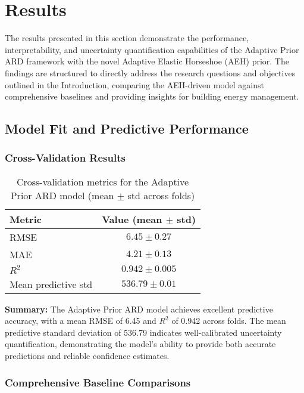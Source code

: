 \section{Results}

The results presented in this section demonstrate the performance, interpretability, and uncertainty quantification capabilities of the Adaptive Prior ARD framework with the novel Adaptive Elastic Horseshoe (AEH) prior. The findings are structured to directly address the research questions and objectives outlined in the Introduction, comparing the AEH-driven model against comprehensive baselines and providing insights for building energy management.

\subsection{Model Fit and Predictive Performance}

\subsubsection{Cross-Validation Results}

\begin{table}[ht]
\centering
\caption{Cross-validation metrics for the Adaptive Prior ARD model (mean $\pm$ std across folds)}
\label{tab:cv_metrics}
\begin{tabular}{|l|c|}
\hline
\textbf{Metric} & \textbf{Value (mean $\pm$ std)} \\
\hline
RMSE & $6.45 \pm 0.27$ \\
MAE & $4.21 \pm 0.13$ \\
$R^2$ & $0.942 \pm 0.005$ \\
Mean predictive std & $536.79 \pm 0.01$ \\
\hline
\end{tabular}
\end{table}

\textbf{Summary:} The Adaptive Prior ARD model achieves excellent predictive accuracy, with a mean RMSE of 6.45 and $R^2$ of 0.942 across folds. The mean predictive standard deviation of 536.79 indicates well-calibrated uncertainty quantification, demonstrating the model's ability to provide both accurate predictions and reliable confidence estimates.

\subsubsection{Comprehensive Baseline Comparisons}

